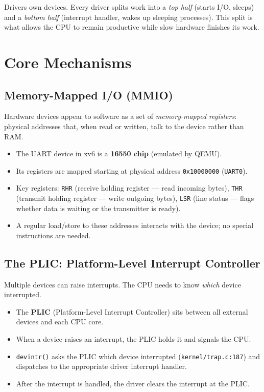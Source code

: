 \documentclass[11pt, a4paper]{article}
\begin{document}
\begin{tcolorbox}[summary, title={Section Summary}]
Drivers own devices. Every driver splits work into a \emph{top half} (starts I/O, sleeps) and a \emph{bottom half} (interrupt handler, wakes up sleeping processes). This split is what allows the CPU to remain productive while slow hardware finishes its work.
\end{tcolorbox}

\section{Core Mechanisms}

\subsection{Memory-Mapped I/O (MMIO)}

Hardware devices appear to software as a set of \emph{memory-mapped registers}: physical addresses that, when read or written, talk to the device rather than RAM.

\begin{itemize}[leftmargin=1.5em]
  \item The UART device in xv6 is a \textbf{16550 chip} (emulated by QEMU).
  \item Its registers are mapped starting at physical address \lstinline|0x10000000| (\lstinline|UART0|).
  \item Key registers: \lstinline|RHR| (receive holding register --- read incoming bytes), \lstinline|THR| (transmit holding register --- write outgoing bytes), \lstinline|LSR| (line status --- flags whether data is waiting or the transmitter is ready).
  \item A regular load/store to these addresses interacts with the device; no special instructions are needed.
\end{itemize}

\subsection{The PLIC: Platform-Level Interrupt Controller}

Multiple devices can raise interrupts. The CPU needs to know \emph{which} device interrupted.

\begin{itemize}[leftmargin=1.5em]
  \item The \textbf{PLIC} (Platform-Level Interrupt Controller) sits between all external devices and each CPU core.
  \item When a device raises an interrupt, the PLIC holds it and signals the CPU.
  \item \lstinline|devintr()| asks the PLIC which device interrupted (\lstinline|kernel/trap.c:187|) and dispatches to the appropriate driver interrupt handler.
  \item After the interrupt is handled, the driver clears the interrupt at the PLIC.
\end{itemize}
\end{document}
